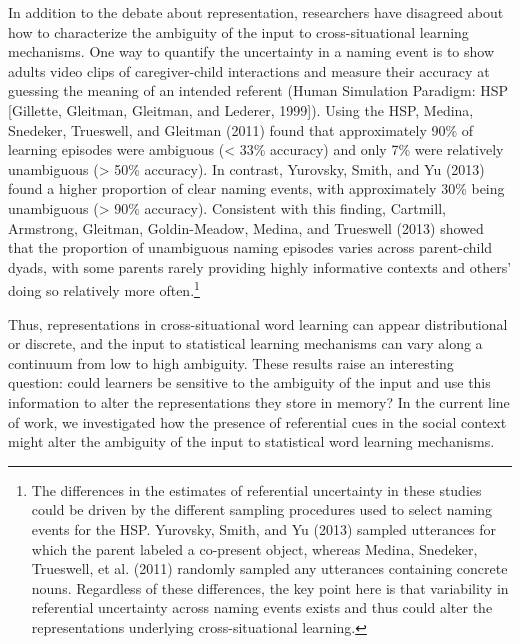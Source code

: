 \documentclass[authoryear, review]{elsarticle}
\begin{document}
In addition to the debate about representation, researchers have
disagreed about how to characterize the ambiguity of the input to
cross-situational learning mechanisms. One way to quantify the
uncertainty in a naming event is to show adults video clips of
caregiver-child interactions and measure their accuracy at guessing the
meaning of an intended referent (Human Simulation Paradigm: HSP
{[}Gillette, Gleitman, Gleitman, and Lederer, 1999{]}). Using the HSP,
Medina, Snedeker, Trueswell, and Gleitman (2011) found that
approximately 90\% of learning episodes were ambiguous (\textless{} 33\%
accuracy) and only 7\% were relatively unambiguous (\textgreater{} 50\%
accuracy). In contrast, Yurovsky, Smith, and Yu (2013) found a higher
proportion of clear naming events, with approximately 30\% being
unambiguous (\textgreater{} 90\% accuracy). Consistent with this
finding, Cartmill, Armstrong, Gleitman, Goldin-Meadow, Medina, and
Trueswell (2013) showed that the proportion of unambiguous naming
episodes varies across parent-child dyads, with some parents rarely
providing highly informative contexts and others' doing so relatively
more often.\footnote{The differences in the estimates of referential
  uncertainty in these studies could be driven by the different sampling
  procedures used to select naming events for the HSP. Yurovsky, Smith,
  and Yu (2013) sampled utterances for which the parent labeled a
  co-present object, whereas Medina, Snedeker, Trueswell, et al. (2011)
  randomly sampled any utterances containing concrete nouns. Regardless
  of these differences, the key point here is that variability in
  referential uncertainty across naming events exists and thus could
  alter the representations underlying cross-situational learning.}

Thus, representations in cross-situational word learning can appear
distributional or discrete, and the input to statistical learning
mechanisms can vary along a continuum from low to high ambiguity. These
results raise an interesting question: could learners be sensitive to
the ambiguity of the input and use this information to alter the
representations they store in memory? In the current line of work, we
investigated how the presence of referential cues in the social context
might alter the ambiguity of the input to statistical word learning
mechanisms.
\end{document}
